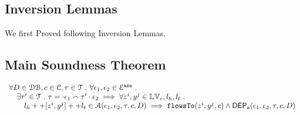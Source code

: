 \subsection{Inversion Lemmas}
We first Proved following Inversion Lemmas.

\clearpage
\subsection{Main Soundness Theorem}
\begin{thm}
\label{thm:alg_correct}
\[
  \begin{array}{l}
    \forall D \in \mathcal{DB} , c \in \mathcal{C}, \mathtt{\tau} \in \mathcal{T} ~.~ \forall \mathtt{\epsilon}_1, \mathtt{\epsilon}_2 \in \mathcal{E}^{\mathtt{{asn}}} ~.~
    \\ \quad 
     \exists \mathtt{\tau}' \in \mathcal{T} ~.~ \mathtt{\tau} = \cdot \mathtt{\epsilon}_1 \smallfrown \mathtt{\tau}' \cdot \mathtt{\epsilon}_2
     \implies    \forall  z^i, y^j \in \mathbb{LV}_c, l_h, l_t ~.~ 
    \\ \qquad 
     l_h ++ [z^i, y^j] ++ l_t \in \mathcal{A}(\mathtt{\epsilon}_1, \mathtt{\epsilon}_2, \mathtt{\tau}, c, D)
     \implies \mathtt{flowsTo}(z^i, y^j, c) \land \mathsf{DEP_{\mathtt{e}}}(\mathtt{\epsilon}_1, \mathtt{\epsilon}_2, \mathtt{\tau}, {c}, D) 
  \end{array}
\]
\end{thm}

